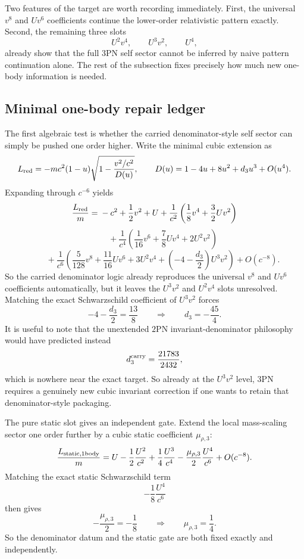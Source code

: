 \documentclass[11pt]{article}
\begin{document}
Two features of the target are worth recording immediately.  First, the
universal $v^8$ and $Uv^6$ coefficients continue the lower-order relativistic
pattern exactly.  Second, the remaining three slots
\[
U^2v^4,
\qquad
U^3v^2,
\qquad
U^4,
\]
already show that the full $3$PN self sector cannot be inferred by naive pattern
continuation alone.  The rest of the subsection fixes precisely how much new
one-body information is needed.

\subsection{Minimal one-body repair ledger}
\label{sec:onebody-repair}

The first algebraic test is whether the carried denominator-style self sector can
simply be pushed one order higher.  Write the minimal cubic extension as
\[
L_{\rm red}
=-mc^2(1-u)\sqrt{1-\frac{v^2/c^2}{D(u)}},
\qquad
D(u)=1-4u+8u^2+d_3u^3+O(u^4).
\]
Expanding through $c^{-6}$ yields
\[
\frac{L_{\rm red}}{m}
={}-c^2+\frac12v^2+U
+\frac{1}{c^2}\left(\frac18v^4+\frac32Uv^2\right)
\]
\[
\qquad
+\frac{1}{c^4}\left(\frac1{16}v^6+\frac78Uv^4+2U^2v^2\right)
\]
\[
\qquad
+\frac{1}{c^6}\left(
\frac5{128}v^8
+\frac{11}{16}Uv^6
+3U^2v^4
+\left(-4-\frac{d_3}{2}\right)U^3v^2
\right)
+O(c^{-8}).
\]
So the carried denominator logic already reproduces the universal $v^8$ and
$Uv^6$ coefficients automatically, but it leaves the $U^3v^2$ and $U^2v^4$
slots unresolved.  Matching the exact Schwarzschild coefficient of $U^3v^2$
forces
\[
-4-\frac{d_3}{2}=\frac{13}{8}
\qquad\Longrightarrow\qquad
\boxed{d_3=-\frac{45}{4}.}
\]
It is useful to note that the unextended $2$PN invariant-denominator philosophy
would have predicted instead
\[
d_3^{\rm carry}=\frac{21783}{2432},
\]
which is nowhere near the exact target.  So already at the $U^3v^2$ level,
$3$PN requires a genuinely new cubic invariant correction if one wants to retain
that denominator-style packaging.

The pure static slot gives an independent gate.  Extend the local mass-scaling
sector one order further by a cubic static coefficient $\mu_{\rho,3}$:
\[
\frac{L_{\rm static,1body}}{m}
=
U-\frac12\frac{U^2}{c^2}+\frac14\frac{U^3}{c^4}
-\frac{\mu_{\rho,3}}{2}\frac{U^4}{c^6}+O(c^{-8}).
\]
Matching the exact static Schwarzschild term
\[
-\frac18\frac{U^4}{c^6}
\]
then gives
\[
-\frac{\mu_{\rho,3}}{2}=-\frac18
\qquad\Longrightarrow\qquad
\boxed{\mu_{\rho,3}=\frac14.}
\]
So the denominator datum and the static gate are both fixed exactly and
independently.
\end{document}
